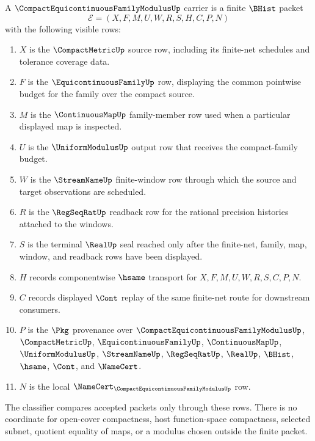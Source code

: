 \begin{definition}
\label{def:compact-equicontinuous-family-modulus-carrier}
A $\CompactEquicontinuousFamilyModulusUp$ carrier is a finite $\BHist$ packet
$$
\mathcal{E}=(X,F,M,U,W,R,S,H,C,P,N)
$$
with the following visible rows:
\begin{enumerate}
\item $X$ is the $\CompactMetricUp$ source row, including its finite-net schedules and tolerance coverage data.
\item $F$ is the $\EquicontinuousFamilyUp$ row, displaying the common pointwise budget for the family over the compact source.
\item $M$ is the $\ContinuousMapUp$ family-member row used when a particular displayed map is inspected.
\item $U$ is the $\UniformModulusUp$ output row that receives the compact-family budget.
\item $W$ is the $\StreamNameUp$ finite-window row through which the source and target observations are scheduled.
\item $R$ is the $\RegSeqRatUp$ readback row for the rational precision histories attached to the windows.
\item $S$ is the terminal $\RealUp$ seal reached only after the finite-net, family, map, window, and readback rows have been displayed.
\item $H$ records componentwise $\hsame$ transport for $X,F,M,U,W,R,S,C,P,N$.
\item $C$ records displayed $\Cont$ replay of the same finite-net route for downstream consumers.
\item $P$ is the $\Pkg$ provenance over $\CompactEquicontinuousFamilyModulusUp$, $\CompactMetricUp$, $\EquicontinuousFamilyUp$, $\ContinuousMapUp$, $\UniformModulusUp$, $\StreamNameUp$, $\RegSeqRatUp$, $\RealUp$, $\BHist$, $\hsame$, $\Cont$, and $\NameCert$.
\item $N$ is the local $\NameCert_{\CompactEquicontinuousFamilyModulusUp}$ row.
\end{enumerate}
The classifier compares accepted packets only through these rows. There is no coordinate for open-cover compactness, host function-space compactness, selected subnet, quotient equality of maps, or a modulus chosen outside the finite packet.
\end{definition}

